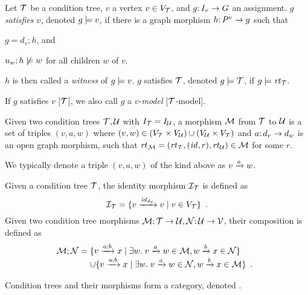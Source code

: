 \begin{definition}[satisfaction]\label{def:satisfaction}
Let ${\mathcal{T}}$ be a condition tree, $v$ a vertex $v\in V_{\mathcal{T}}$,  and $g{:}\, I_v\rightarrow G$ an assignment. $g$ \emph{satisfies $v$}, denoted $g\models v$, if there is a graph morphism $h{:}\, P^v\rightarrow g$ such that
\begin{inumerate}
\item $g=d_v;h$, and 
\item $u_w;h\not\models w$ for all children $w$ of $v$.
\end{inumerate}
$h$ is then called a \emph{witness} of $g\models v$.
$g$ satisfies ${\mathcal{T}}$, denoted $g\models{\mathcal{T}}$, if $g\models\mathit{rt}_{{\mathcal{T}}}$.
\end{definition}
%
If $g$ satisfies $v$ [${\mathcal{T}}$], we also call $g$ a \emph{$v$-model} [${\mathcal{T}}$-model].


\begin{definition}[morphism]
Given two condition trees ${\mathcal{T}},{\mathcal{U}}$ with $I_{\mathcal{T}}=I_{\mathcal{U}}$, a morphism ${\mathcal{M}}$ from ${\mathcal{T}}$ to ${\mathcal{U}}$ is a set of triples $(v,a,w)$ where $(v,w)\in (V_{\mathcal{T}}\times V_{\mathcal{U}})\cup (V_{\mathcal{U}}\times V_{\mathcal{T}})$ and $a{:}\, d_v\rightarrow d_w$ is an open graph morphism, such that $\mathit{rt}_{{\mathcal{M}}}=(\mathit{rt}_{{\mathcal{T}}},({\mathit{id}},r),\mathit{rt}_{{\mathcal{U}}})\in {\mathcal{M}}$ for some $r$.
\end{definition}
%
We typically denote a triple $(v,a,w)$ of the kind above as $v\xrightarrow{a} w$.

Given a condition tree ${\mathcal{T}}$, the identity morphism ${\mathcal{I}}_{\mathcal{T}}$ is defined as
\[ {\mathcal{I}}_{\mathcal{T}} = \{{{v}\xrightarrow{{\mathit{id}}_{d_v}}{v} \mid v\in V_{\mathcal{T}}}\} \enspace. \]
Given two condition tree morphisms ${\mathcal{M}}{:}\, {\mathcal{T}}\rightarrow {\mathcal{U}},{\mathcal{N}}{:}\, {\mathcal{U}}\rightarrow {\mathcal{V}}$, their composition is defined as
\[ \cM;\cN =
\begin{array}[t]{@{}l}
	\setof{\trip v{a;b}x \mid \exists w\st \trip v a w\in\cM, \trip wbx\in \cN} \\
	\cup \setof{\trip v{a;b}x \mid \exists w\st \trip vaw\in\cN, \trip wbx\in\cM} \enspace.
\end{array}
\]

\begin{proposition}
Condition trees and their morphisms form a category, denoted {\CT}.
\end{proposition}

